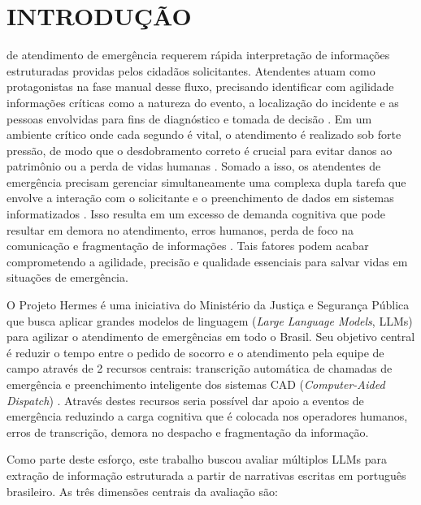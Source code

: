 \documentclass{IEEEphot}
\begin{document}

\maketitle

\section{INTRODUÇÃO}

 de atendimento de emergência requerem rápida interpretação de informações estruturadas providas pelos cidadãos solicitantes. Atendentes atuam como protagonistas na fase manual desse fluxo, precisando identificar com agilidade informações críticas como a natureza do evento, a localização do incidente e as pessoas envolvidas para fins de diagnóstico e tomada de decisão \cite{niemeyer2015atendimento}. Em um ambiente crítico onde cada segundo é vital, o atendimento é realizado sob forte pressão, de modo que o desdobramento correto é crucial para evitar danos ao patrimônio ou a perda de vidas humanas \cite{souza1996dimensionamento, niemeyer2015atendimento}. Somado a isso, os atendentes de emergência precisam gerenciar simultaneamente uma complexa dupla tarefa que envolve a interação com o solicitante e o preenchimento de dados em sistemas informatizados \cite{niemeyer2015atendimento}. Isso resulta em um excesso de demanda cognitiva que pode resultar em demora no atendimento, erros humanos, perda de foco na comunicação e fragmentação de informações \cite{niemeyer2015atendimento}. Tais fatores podem acabar comprometendo a agilidade, precisão e qualidade essenciais para salvar vidas em situações de emergência.

O Projeto Hermes \cite{act97_2025} é uma iniciativa do Ministério da Justiça e Segurança Pública que busca aplicar grandes modelos de linguagem (\textit{Large Language Models}, LLMs) para agilizar o atendimento de emergências em todo o Brasil. Seu objetivo central é reduzir o tempo entre o pedido de socorro e o atendimento pela equipe de campo através de 2 recursos centrais: transcrição automática de chamadas de emergência e preenchimento inteligente dos sistemas CAD (\textit{Computer-Aided Dispatch}) \cite{cad_def}. Através destes recursos seria possível dar apoio a eventos de emergência reduzindo a carga cognitiva que é colocada nos operadores humanos, erros de transcrição, demora no despacho e fragmentação da informação.

Como parte deste esforço, este trabalho buscou avaliar múltiplos LLMs para extração de informação estruturada a partir de narrativas escritas em português brasileiro. As três dimensões centrais da avaliação são:
\end{document}
